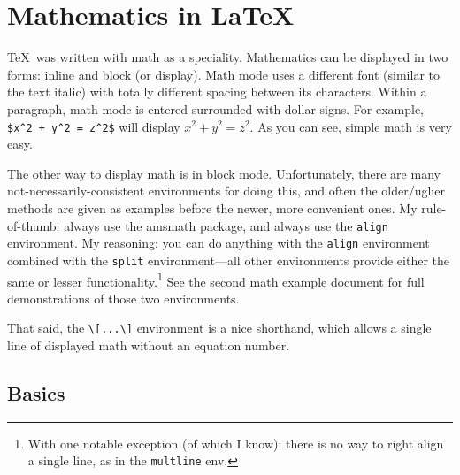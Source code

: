 \documentclass[12pt,article,fleqn]{memoir}
\begin{document}
\chapter*{Mathematics in \LaTeX}

\TeX\ was written with math as a speciality. Mathematics can be displayed in two forms: inline and block (or display). Math mode uses a different font (similar to the text italic) with totally different spacing between its characters. Within a paragraph, math mode is entered surrounded with dollar signs. For example, \verb|$x^2 + y^2 = z^2$| will display $x^2 + y^2 = z^2$. As you can see, simple math is very easy.

The other way to display math is in block mode. Unfortunately, there are many not-necessarily-consistent environments for doing this, and often the older/uglier methods are given as examples before the newer, more convenient ones. My rule-of-thumb: always use the \textsf{amsmath} package, and always use the \texttt{align} environment. My reasoning: you can do anything with the \texttt{align} environment combined with the \texttt{split} environment---all other environments provide either the same or lesser functionality.\footnote{With one notable exception (of which I know): there is no way to right align a single line, as in the \texttt{multline} env.} See the second math example document for full demonstrations of those two environments.

That said, the \verb|\[...\]| environment is a nice shorthand, which allows a single line of displayed math without an equation number.

\section*{Basics}
\end{document}
